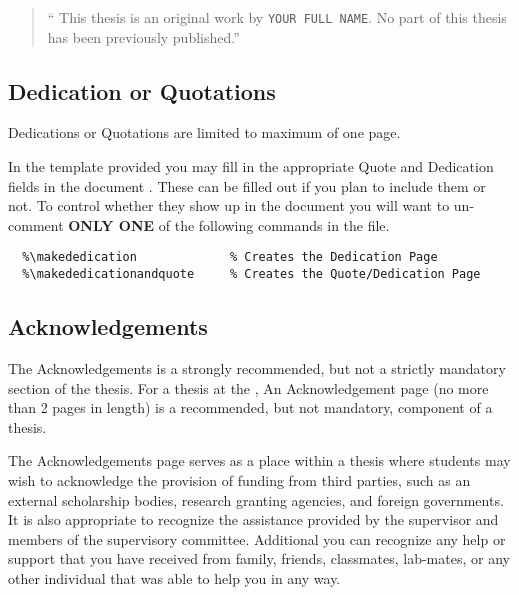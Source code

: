 				\begin{quote}
					\enquote{%
						This thesis is an original work by \texttt{YOUR FULL NAME}. 
						No part of this thesis has been previously published.}
				\end{quote}

		\subsection{Dedication or Quotations}\label{quote}\label{dedication}
			Dedications or Quotations are limited to maximum of one page.
			
			In the template provided you may fill in the appropriate Quote and Dedication fields in the document .
			These can be filled out if you plan to include them or not.
			To control whether they show up in the document you will want to un-comment \textbf{ONLY ONE} of the following commands in the  file.

			\begin{lstlisting}[float=ht,caption=Quote and Dedication Inclusion Options (un-comment only one),label=lst:QuotesAndDedication,style=LaTeXStyle,basicstyle=\scriptsize\ttfamily,]
  %\makequote                  % Creates the Quote Page
  %\makededication             % Creates the Dedication Page
  %\makededicationandquote     % Creates the Quote/Dedication Page
			\end{lstlisting}

		\subsection{Acknowledgements}\label{acknowledgement}
			The Acknowledgements is a strongly recommended, but not a strictly mandatory section of the thesis.
			For a thesis at the \UofA, 
			An Acknowledgement page (no more than 2 pages in length) is a recommended, but not mandatory, component of a thesis.
	
			The Acknowledgements page serves as a place within a thesis where students may wish to acknowledge the provision of funding from third parties, such as an external scholarship bodies, research granting agencies, and foreign governments. 
			It is also appropriate to recognize the assistance provided by the supervisor and members of the supervisory committee.
			Additional you can recognize any help or support that you have received from family, friends, classmates, lab-mates, or any other individual that was able to help you in any way.
			
